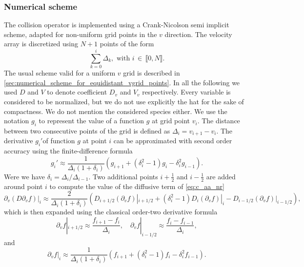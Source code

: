 \documentclass[11pt]{article}
\begin{document}
\subsubsection{Numerical scheme}
\label{sub:numerical_scheme}
The collision operator is implemented using a Crank-Nicolson semi implicit scheme, adapted for non-uniform grid points in the $v$ direction. The velocity array is discretized using $N +1$ points of the form  
%
\begin{equation}  
\sum\limits_{k=0}^{i} \Delta_k, \,\, \mathrm{with} \, \, i \, \in \, \llbracket 0, N \rrbracket. 
\end{equation}
%
The usual scheme valid for a uniform $v$ grid is described in \cref{sec:numerical_scheme_for_equidistant_vgrid_points}. In all the following we used $D$ and $V$ to denote coefficient $D_v$ and $V_v$ respectively. Every variable is considered to be normalized, but we do not use explicitly the hat for the sake of compactness. We do not mention the considered species either. We use the notation $g_i$ to represent the value of a function $g$ at grid point $v_i$. The distance between two consecutive points of the grid is defined as $\Delta_i = v_{i+1}-v_i$. The derivative $g_i'$of function $g$ at point $i$ can be approximated with second order accuracy using the finite-difference formula
%
\begin{equation}\label{eq:diff_fmla}
  g_i' \approx \dfrac{1}{\Delta_i( 1 + \delta_i ) }\left( g_{i+1} + ( \delta_i^2 -1)g_i  - \delta_i^2 g_{i-1}\right).
\end{equation}
%
Were we have $\delta_i = \Delta_i / \Delta_{i-1}$. Two additional points $i+\tfrac{1}{2}$ and $i-\tfrac{1}{2}$ are added around point $i$ to compute the value of the diffusive term of \cref{eq:c_aa_nr}
%
\begin{equation}\label{eq:diff_tem}
  \partial_{v} (D \partial_{v}f )|_i \approx \dfrac{2}{\Delta_i(1+\delta_i)}\left( D_{i+1/2}  \left( \partial_{v}f \right)|_{i+1/2}  + ( \delta_i^2-1)D_i \left( \partial_{v} f \right) |_i  - D_{i-1/2}  \left( \partial_{v}f \right)|_{i-1/2}\right), 
\end{equation}
%
which is then expanded using the classical order-two derivative formula
%
\begin{equation}
  \partial_{v}f|_{i+1/2} \approx \dfrac{f_{i+1} - f_{i}}{\Delta_i}, \quad  \partial_{v}f|_{i-1/2} \approx \dfrac{f_{i} - f_{i-1}}{\Delta_i},
\end{equation}
%
and
%
\begin{equation}
 \partial_{v}f|_i \approx \dfrac{1}{\Delta_i(1+\delta_i)} \left( f_{i+1} + (\delta_i^2-1)f_i - \delta_i^2f_{i-1} \right).
\end{equation}
\end{document}
